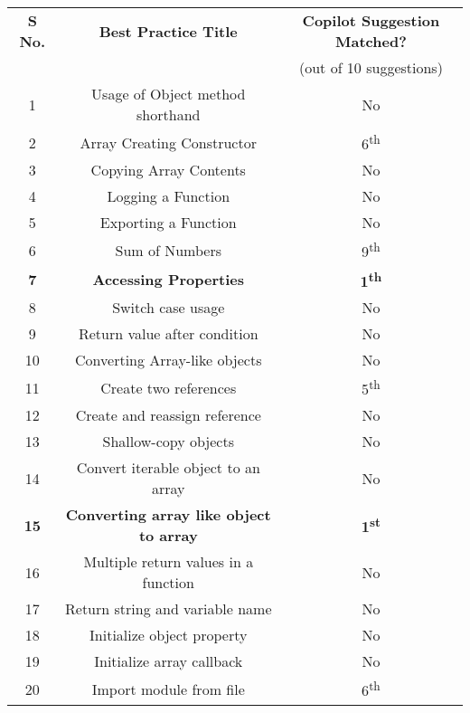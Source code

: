 \begin{table}[hbt!]
        \centering
    \begin{tabular}{|c|c|c|}
        \hline

        \textbf{S No.} & \textbf{Best Practice  Title} & \textbf{Copilot Suggestion Matched?} \\
         & & (out of 10 suggestions) \\
         \hline
         1 & Usage of Object method shorthand & No \\
         \hline
         2 & Array Creating Constructor & 6\textsuperscript{th} \\
         \hline
         3 & Copying Array Contents  & No \\
         \hline
         4 & Logging a Function &  No \\
         \hline
         5 & Exporting a Function & No \\
         \hline
         6 & Sum of Numbers & 9\textsuperscript{th} \\
         \hline
         \textbf{7} & \textbf{Accessing Properties} & \textbf{1\textsuperscript{th}} \\
         \hline
         8 & Switch case usage & No \\
         \hline
         9 & Return value after condition & No \\
         \hline
         10 & Converting Array-like objects  & No \\
         \hline
         11 & Create two references & 5\textsuperscript{th} \\
         \hline
         12 & Create and reassign reference & No \\
         \hline
         13 & Shallow-copy objects  & No \\
         \hline
         14 & Convert iterable object to an array & No \\
         \hline
         \textbf{15} & \textbf{Converting array like object to array} & \textbf{1\textsuperscript{st}} \\
         \hline
          16 & Multiple return values in a function & No \\
          \hline
          17 & Return string and variable name & No \\
          \hline
          18 & Initialize object property & No \\
          \hline
          19 & Initialize array callback & No \\
          \hline
          20 & Import module from file & 6\textsuperscript{th} \\

\end{tabular}
\end{table}

